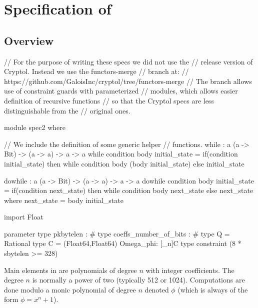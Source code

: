 
\chapter{\texorpdfstring{Specification of \falcon}{Specification of Falcon}}\label{chap:spec}

\section{Overview}\label{sec:spec:overview}

\begin{code}
  // For the purpose of writing these specs we did not use the
  // release version of Cryptol. Instead we use the functors-merge 
  // branch at:
  // https://github.com/GaloisInc/cryptol/tree/functors-merge
  // The branch allows use of constraint guards with parameterized
  // modules, which allows easier definition of recursive functions 
  // so that the Cryptol specs are less distinguishable from the 
  // original ones.
\end{code}

\begin{code}
  module spec2 where

  // We include the definition of some generic helper
  // functions.
  while : {a} (a -> Bit) -> (a -> a) -> a -> a
  while condition body initial_state =
    if(condition initial_state)
    then while condition body (body initial_state)
    else initial_state

  dowhile : {a} (a -> Bit) -> (a -> a) -> a -> a
  dowhile condition body initial_state =
    if(condition next_state)
    then while condition body next_state
    else next_state
      where next_state = body initial_state
\end{code}

\begin{code}
  import Float

  parameter
    type pkbytelen : #
    type coeffs_number_of_bits : #
    type Q = Rational
    type C = (Float64,Float64)
    Omega_phi: [_n]C
    type constraint (8 * sbytelen >= 328)
\end{code} 

Main elements in \falcon are polynomials of degree $n$ with integer
coefficients. The degree $n$ is normally a power of two (typically 512 or
1024). Computations are done modulo a monic polynomial of degree $n$ denoted
$\phi$ (which is always of the form $\phi = x^n + 1$).

